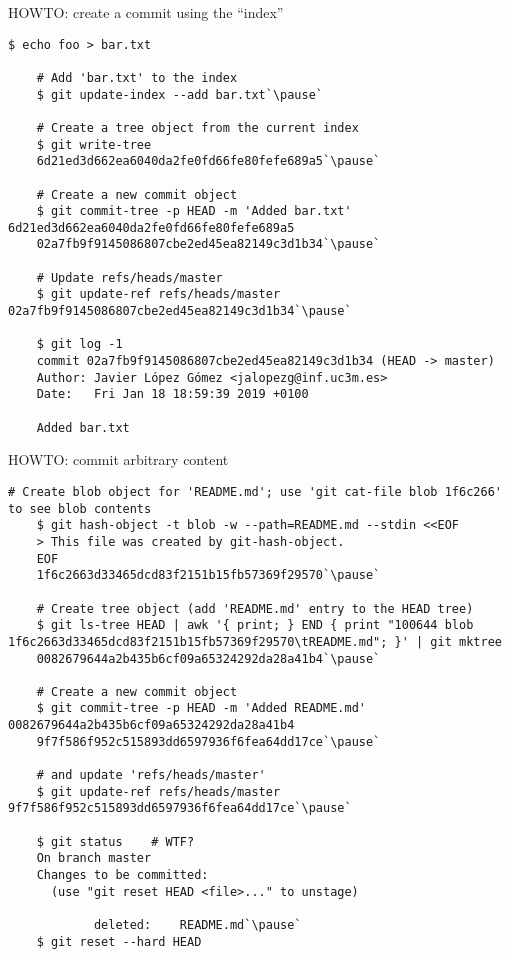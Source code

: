 \begin{frame}[fragile]{HOWTO: create a commit using the ``index''}
  \begin{lstlisting}[style=bash]
    $ echo foo > bar.txt

    # Add 'bar.txt' to the index
    $ git update-index --add bar.txt`\pause`

    # Create a tree object from the current index
    $ git write-tree
    6d21ed3d662ea6040da2fe0fd66fe80fefe689a5`\pause`

    # Create a new commit object
    $ git commit-tree -p HEAD -m 'Added bar.txt' 6d21ed3d662ea6040da2fe0fd66fe80fefe689a5
    02a7fb9f9145086807cbe2ed45ea82149c3d1b34`\pause`

    # Update refs/heads/master
    $ git update-ref refs/heads/master 02a7fb9f9145086807cbe2ed45ea82149c3d1b34`\pause`

    $ git log -1
    commit 02a7fb9f9145086807cbe2ed45ea82149c3d1b34 (HEAD -> master)
    Author: Javier López Gómez <jalopezg@inf.uc3m.es>
    Date:   Fri Jan 18 18:59:39 2019 +0100

    Added bar.txt
  \end{lstlisting}
\end{frame}

\begin{frame}[fragile]{HOWTO: commit arbitrary content}
  \begin{lstlisting}[style=bash]
    # Create blob object for 'README.md'; use 'git cat-file blob 1f6c266' to see blob contents
    $ git hash-object -t blob -w --path=README.md --stdin <<EOF
    > This file was created by git-hash-object.
    EOF
    1f6c2663d33465dcd83f2151b15fb57369f29570`\pause`

    # Create tree object (add 'README.md' entry to the HEAD tree)
    $ git ls-tree HEAD | awk '{ print; } END { print "100644 blob 1f6c2663d33465dcd83f2151b15fb57369f29570\tREADME.md"; }' | git mktree
    0082679644a2b435b6cf09a65324292da28a41b4`\pause`

    # Create a new commit object
    $ git commit-tree -p HEAD -m 'Added README.md' 0082679644a2b435b6cf09a65324292da28a41b4
    9f7f586f952c515893dd6597936f6fea64dd17ce`\pause`

    # and update 'refs/heads/master'
    $ git update-ref refs/heads/master 9f7f586f952c515893dd6597936f6fea64dd17ce`\pause`

    $ git status    # WTF?
    On branch master
    Changes to be committed:
      (use "git reset HEAD <file>..." to unstage)

            deleted:    README.md`\pause`
    $ git reset --hard HEAD
  \end{lstlisting}
\end{frame}
